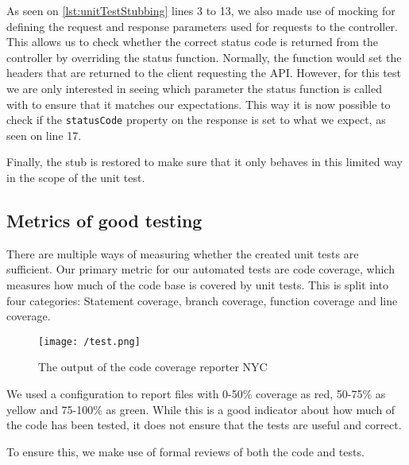 As seen on \autoref{lst:unitTestStubbing} lines 3 to 13, we also made use of mocking for defining the request and response parameters used for requests to the controller.
This allows us to check whether the correct status code is returned from the controller by overriding the status function.
Normally, the function would set the headers that are returned to the client requesting the API.
However, for this test we are only interested in seeing which parameter the status function is called with to ensure that it matches our expectations.
This way it is now possible to check if the \texttt{statusCode} property on the response is set to what we expect, as seen on line 17.

Finally, the stub is restored to make sure that it only behaves in this limited way in the scope of the unit test.

\subsection{Metrics of good testing}
There are multiple ways of measuring whether the created unit tests are sufficient.
Our primary metric for our automated tests are code coverage, which measures how much of the code base is covered by unit tests.
This is split into four categories: Statement coverage, branch coverage, function coverage and line coverage.

\begin{figure}[H]
    \texttt{[image: /test.png]}
     \caption{The output of the code coverage reporter NYC}
     \label{fig:testResults}
 \end{figure}

We used a configuration to report files with 0-50\% coverage as red, 50-75\% as yellow and 75-100\% as green.
While this is a good indicator about how much of the code has been tested, it does not ensure that the tests are useful and correct.

To ensure this, we make use of formal reviews of both the code and tests.